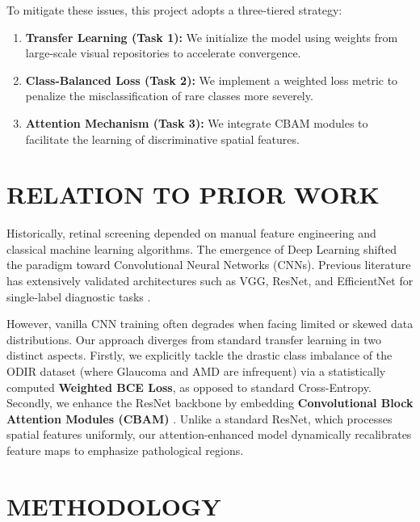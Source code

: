 \documentclass[10pt, letterpaper, twocolumn]{article}
\begin{document}
To mitigate these issues, this project adopts a three-tiered strategy:
\begin{enumerate}[noitemsep]
    \item \textbf{Transfer Learning (Task 1):} We initialize the model using weights from large-scale visual repositories to accelerate convergence.
    \item \textbf{Class-Balanced Loss (Task 2):} We implement a weighted loss metric to penalize the misclassification of rare classes more severely.
    \item \textbf{Attention Mechanism (Task 3):} We integrate CBAM modules to facilitate the learning of discriminative spatial features.
\end{enumerate}

\section{RELATION TO PRIOR WORK}
\label{sec:prior}

Historically, retinal screening depended on manual feature engineering and classical machine learning algorithms. The emergence of Deep Learning shifted the paradigm toward Convolutional Neural Networks (CNNs). Previous literature has extensively validated architectures such as VGG, ResNet, and EfficientNet for single-label diagnostic tasks \cite{he2016deep}.

However, vanilla CNN training often degrades when facing limited or skewed data distributions. Our approach diverges from standard transfer learning in two distinct aspects. Firstly, we explicitly tackle the drastic class imbalance of the ODIR dataset (where Glaucoma and AMD are infrequent) via a statistically computed \textbf{Weighted BCE Loss}, as opposed to standard Cross-Entropy. Secondly, we enhance the ResNet backbone by embedding \textbf{Convolutional Block Attention Modules (CBAM)} \cite{woo2018cbam}. Unlike a standard ResNet, which processes spatial features uniformly, our attention-enhanced model dynamically recalibrates feature maps to emphasize pathological regions.

\section{METHODOLOGY}
\end{document}
